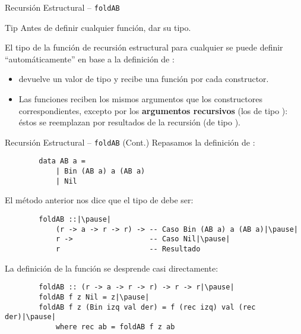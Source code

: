 \documentclass[8pt]{beamer}
\begin{document}
\begin{frame}{Recursión Estructural -- \texttt{foldAB}}
    \begin{block}{Tip}
        Antes de definir cualquier función, \alert{dar su tipo}.
    \end{block}

    \pause

    El tipo de la función de recursión estructural  para cualquier  se puede definir ``automáticamente'' en base a la definición de :
    
    \pause

    \begin{itemize}[<+->]
        \item {} devuelve un valor de tipo  y recibe una función  por cada constructor.
        \item Las funciones reciben los mismos argumentos que los constructores correspondientes, excepto por los \textbf{argumentos recursivos} (los de tipo ): éstos se reemplazan por resultados de la recursión (de tipo ).
    \end{itemize}
\end{frame}

\begin{frame}[fragile]{Recursión Estructural -- \texttt{foldAB} (Cont.)}
    Repasamos la definición de :

    \begin{verbatim}
        data AB a =
            | Bin (AB a) a (AB a)
            | Nil
    \end{verbatim}

    \pause

    El método anterior nos dice que el tipo de  debe ser:
    
    \begin{verbatim}
        foldAB ::|\pause|
            (r -> a -> r -> r) -> -- Caso Bin (AB a) a (AB a)|\pause|
            r ->                  -- Caso Nil|\pause|
            r                     -- Resultado
    \end{verbatim}

    \pause

    La definición de la función se desprende casi directamente:
    \begin{verbatim}
        foldAB :: (r -> a -> r -> r) -> r -> r|\pause|
        foldAB f z Nil = z|\pause|
        foldAB f z (Bin izq val der) = f (rec izq) val (rec der)|\pause|
            where rec ab = foldAB f z ab
        
    \end{verbatim}
\end{frame}
\end{document}
